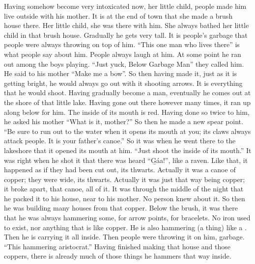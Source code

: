 \begin{pairs}
\begin{Rightside}
Having somehow become very intoxicated now, her little child, people made him live outside with his mother.
It is at the end of town that she made a brush house there.
Her little child, she was there with him.
She always bathed her little child in that brush house.
Gradually he gets very tall.
It is people’s garbage that people were always throwing on top of him.
\qqk{}“This one man who lives there” is what people say about him.
People always laugh at him.
At some point he ran out among the boys playing.
\qqk{}“Just yuck, Below Garbage Man” they called him.
He said to his mother “Make me a bow”.
So then having made it, just as it is getting bright, he would always go out with it shooting arrows.
It is everything that he would shoot.
Having gradually become a man, eventually he comes out at the shore of that little lake.
\pend
\pstart
{}Having gone out there however many times, it ran up along below for him.
The inside of its mouth is red.
Having done so twice to him, he asked his mother
\qqk{}“What is it, mother?”
So then he made a new spear point.
\qqk{}“Be sure to run out to the water when it opens its mouth at you;
its claws always attack people.
It is your father’s canoe.”
So it was when he went there to the lakeshore that it opened its mouth at him.
“Just shoot the inside of its mouth.”
It was right when he shot it that there was heard “G̱áa!”, like a raven.
Like that, it happened as if they had been cut out, its thwarts.
Actually it was a canoe of copper;
they were wide, its thwarts.
Actually it was just that way being copper;
it broke apart, that canoe, all of it.
It was through the middle of the night that he packed it to his house, near to his mother.
No person knew about it.
\pend
\pstart
{}So then he was building many houses from that copper.
Below the brush, it was there that he was always hammering some, for arrow points, for bracelets.
No iron used to exist, nor anything that is like copper.
He is also hammering (a thing) like a .
Then he is carrying it all inside.
Then people were throwing it on him, garbage.
“This hammering aristocrat.”
Having finished making that house and those coppers, there is already much of those things he hammers that way inside.

\end{Rightside}
\end{pairs}
